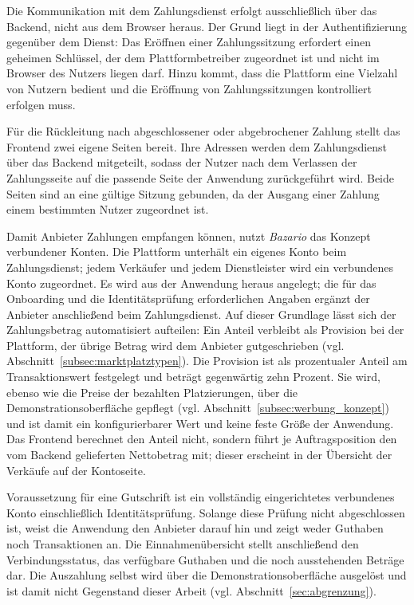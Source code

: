 Die Kommunikation mit dem Zahlungsdienst erfolgt ausschließlich über
das Backend, nicht aus dem Browser heraus. Der Grund liegt in der
Authentifizierung gegenüber dem Dienst: Das Eröffnen einer
Zahlungssitzung erfordert einen geheimen Schlüssel, der dem
Plattformbetreiber zugeordnet ist und nicht im Browser des Nutzers
liegen darf. Hinzu kommt, dass die Plattform eine Vielzahl von
Nutzern bedient und die Eröffnung von Zahlungssitzungen kontrolliert
erfolgen muss.

Für die Rückleitung nach abgeschlossener oder abgebrochener Zahlung
stellt das Frontend zwei eigene Seiten bereit. Ihre Adressen werden
dem Zahlungsdienst über das Backend mitgeteilt, sodass der Nutzer
nach dem Verlassen der Zahlungsseite auf die passende Seite der
Anwendung zurückgeführt wird. Beide Seiten sind an eine gültige
Sitzung gebunden, da der Ausgang einer Zahlung einem bestimmten
Nutzer zugeordnet ist.

Damit Anbieter Zahlungen empfangen können, nutzt \textit{Bazario} das
Konzept verbundener Konten. Die Plattform unterhält ein eigenes Konto
beim Zahlungsdienst; jedem Verkäufer und jedem Dienstleister wird
ein verbundenes Konto zugeordnet. Es wird aus der Anwendung heraus
angelegt; die für das Onboarding und die Identitätsprüfung
erforderlichen Angaben ergänzt der Anbieter anschließend beim
Zahlungsdienst. Auf dieser Grundlage lässt sich der
Zahlungsbetrag automatisiert aufteilen: Ein Anteil verbleibt als
Provision bei der Plattform, der übrige Betrag wird dem Anbieter
gutgeschrieben (vgl. Abschnitt~\ref{subsec:marktplatztypen}). Die
Provision ist als prozentualer Anteil am Transaktionswert festgelegt
und beträgt gegenwärtig zehn Prozent. Sie wird, ebenso wie die Preise
der bezahlten Platzierungen, über die Demonstrationsoberfläche
gepflegt (vgl. Abschnitt~\ref{subsec:werbung_konzept}) und ist damit
ein konfigurierbarer Wert und keine feste Größe der Anwendung. Das
Frontend berechnet den Anteil nicht, sondern führt je
Auftragsposition den vom Backend gelieferten Nettobetrag mit; dieser
erscheint in der Übersicht der Verkäufe auf der Kontoseite.

Voraussetzung für eine Gutschrift ist ein vollständig eingerichtetes
verbundenes Konto einschließlich Identitätsprüfung. Solange diese Prüfung
nicht abgeschlossen ist, weist die Anwendung den Anbieter darauf hin
und zeigt weder Guthaben noch Transaktionen an. Die
Einnahmenübersicht stellt anschließend den Verbindungsstatus, das
verfügbare Guthaben und die noch ausstehenden Beträge dar. Die
Auszahlung selbst wird über die Demonstrationsoberfläche
ausgelöst und ist damit nicht Gegenstand dieser Arbeit (vgl.
Abschnitt~\ref{sec:abgrenzung}).


